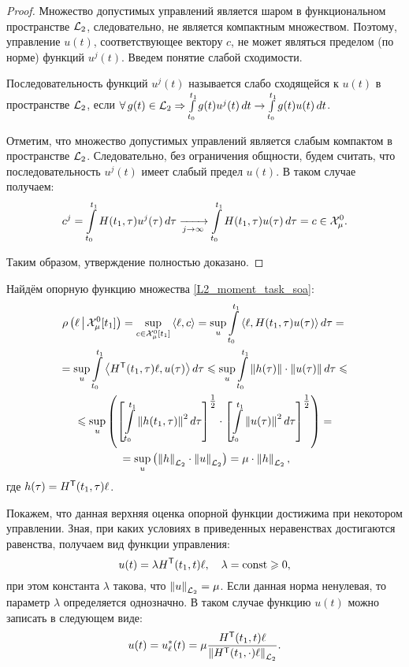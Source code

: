 \begin{proof}
	Множество допустимых управлений является шаром в функциональном пространстве ${\mathcal{L}_2}$,
	следовательно, не является компактным множеством. Поэтому, управление $u(t)$,
	соответствующее вектору $c$, не может являться пределом (по норме) функций $u^j(t)$.
	Введем понятие слабой сходимости.
	
	\begin{df}
	  Последовательность функций $u^j(t)$ называется слабо сходящейся к $u(t)$
	  в пространстве ${\mathcal{L}_2}$,
	  если $\forall g(t) \in \LTwo \Rightarrow
	  \int\limits_{t_0}^{t_1} g(t) u^j(t)\,dt \to
	  \int\limits_{t_0}^{t_1} g(t) u(t)\,dt$.
	\end{df}
	
	Отметим, что множество допустимых управлений является слабым компактом в пространстве ${\mathcal{L}_2}$.
	Следовательно, без ограничения общности, будем считать, что последовательность $u^j(t)$ имеет слабый
	предел $u(t)$. В таком случае получаем:
	\begin{equation*}
		c^j = \int\limits_{t_0}^{t_1} H(t_1, \tau) u^j(\tau)\,d\tau
		\xrightarrow[j \rightarrow \infty]{}
		\int\limits_{t_0}^{t_1} H(t_1, \tau) u(\tau)\,d\tau = c \in \mathcal{X}_\mu^0.
	\end{equation*}
	
	Таким образом, утверждение полностью доказано.
\end{proof}
	
Найдём опорную функцию множества \eqref{L2_moment_task_soa}:
\begin{gather*}
  \rho\left(\ell\,\middle|\,\mathcal{X}_\mu^0[t_1]\right) =
    \sup_{c \in \mathcal{X}_\mu^0[t_1]} \left<\ell,c\right> =
    \sup_{u} \int\limits_{t_0}^{t_1} \left<\ell,H(t_1, \tau) u(\tau)\right> d\tau = {}\\
  {} = \sup_{u} \int\limits_{t_0}^{t_1} \left<H^{\mathsf{T}}(t_1, \tau) \ell,u(\tau)\right> d\tau \leqslant
    \sup_{u} \int\limits_{t_0}^{t_1} \left\| h(\tau) \right\| \cdot \left\| u(\tau) \right\| d\tau \leqslant{}\\
  {} \leqslant \sup_{u}
    \left(
      \left[\int\limits_{t_0}^{t_1} \left\| h(t_1, \tau) \right\|^2 d\tau \right]^{\tfrac{1}{2}} \cdot
      \left[\int\limits_{t_0}^{t_1} \left\| u(\tau) \right\|^2 d\tau \right]^{\tfrac{1}{2}}
    \right) = {}\\
  {} = \sup_{u} \left( \left\| h \right\|_{{\mathcal{L}_2}} \cdot \left\| u \right\|_{{\mathcal{L}_2}} \right) =
    \mu \cdot \left\| h \right\|_{{\mathcal{L}_2}},
\end{gather*}
где $h(\tau) = H^{\mathsf{T}}(t_1, \tau) \ell$.

Покажем, что данная верхняя оценка опорной функции достижима при некотором управлении.
Зная, при каких условиях в приведенных неравенствах достигаются равенства,
получаем вид функции управления:
\begin{equation*}
  u(t) = \lambda H^{\mathsf{T}}(t_1, t) \ell,\quad \lambda = \operatorname{const} \geqslant 0,
\end{equation*}
при этом константа $\lambda$ такова, что $\left\| u \right\|_{{\mathcal{L}_2}} = \mu$.
Если данная норма ненулевая, то параметр $\lambda$ определяется однозначно.
В таком случае функцию $u(t)$ можно записать в следующем виде:
\begin{equation*}
  u(t) = u_{\ell}^{*}(t) = \mu \frac{H^{\mathsf{T}}(t_1, t) \ell}{\left\| H^{\mathsf{T}}(t_1, \cdot) \ell \right\|_{{\mathcal{L}_2}}}.
\end{equation*}


